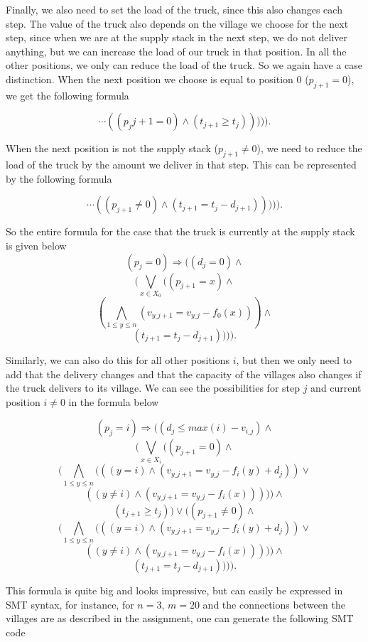 \documentclass[a4paper]{article}
\begin{document}
Finally, we also need to set the load of the truck, since this also changes each step. The value of the truck also depends on the village we choose for the next step, since when we are at the supply stack in the next step, we do not deliver anything, but we can increase the load of our truck in that position. In all the other positions, we only can reduce the load of the truck. So we again have a case distinction. When the next position we choose is equal to position 0 ($p_{j+1} = 0$), we get the following formula

\[ \cdots ((p_j{j+1} = 0) \wedge (t_{j+1} \geq t_j))))).\]

When the next position is not the supply stack ($p_{j+1} \neq 0$), we need to reduce the load of the truck by the amount we deliver in that step. This can be represented by the following formula

\[ \cdots ((p_{j+1} \neq 0) \wedge (t_{j+1} = t_j - d_{j+1}))))).\]

So the entire formula for the case that the truck is currently at the supply stack is given below
\[ (p_j = 0) \Rightarrow ( (d_j = 0) \wedge \]
\[ (\bigvee_{x \in X_0} ((p_{j+1} = x) \wedge \]
\[ (\bigwedge_{1 \leq y \leq n} (v_{y\_j+1} = v_{y\_j} - f_0(x))) \wedge \]
\[ (t_{j+1} = t_j - d_{j+1})))).\]

Similarly, we can also do this for all other positions $i$, but then we only need to add that the delivery changes and that the capacity of the villages also changes if the truck delivers to its village. We can see the possibilities for step $j$ and current position $i \neq 0$ in the formula below

\[ (p_j = i) \Rightarrow ( (d_j \leq max(i) - v_{i\_j}) \wedge \]
\[ (\bigvee_{x \in X_i} ((p_{j+1} = 0) \wedge \]
\[ (\bigwedge_{1 \leq y \leq n} (((y=i) \wedge (v_{y\_j+1} = v_{y\_j} - f_i(y) + d_j)) \vee \]
\[ ((y \neq i) \wedge (v_{y\_j+1} = v_{y\_j} - f_i(x))))) \wedge \]
\[ (t_{j+1} \geq t_j)) \vee ((p_{j+1} \neq 0) \wedge \]
\[ (\bigwedge_{1 \leq y \leq n} (((y=i) \wedge (v_{y\_j+1} = v_{y\_j} - f_i(y) + d_j)) \vee \]
\[ ((y \neq i) \wedge (v_{y\_j+1} = v_{y\_j} - f_i(x))))) \wedge \]
\[ (t_{j+1} = t_j - d_{j+1})))).\]

This formula is quite big and looks impressive, but can easily be expressed in SMT syntax, for instance, for $n=3$, $m=20$ and the connections between the villages are as described in the assignment, one can generate the following SMT code\\
\end{document}
